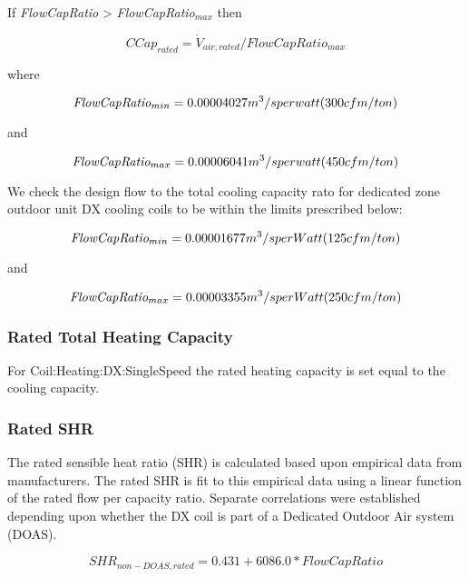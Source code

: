 If \emph{FlowCapRatio} \textgreater{} \emph{FlowCapRatio\(_{max}\)} then

\begin{equation}
CCap_{rated} = \dot V_{air,rated} /FlowCapRatio_{max}
\end{equation}

where

\begin{equation}
\emph{FlowCapRatio\(_{min}\)} = 0.00004027 m^{3}/s per watt (300 cfm/ton)
\end{equation}

and

\begin{equation}
\emph{FlowCapRatio\(_{max}\)} = 0.00006041 m^{3}/s per watt (450 cfm/ton)
\end{equation}

We check the design flow to the total cooling capacity rato for dedicated zone outdoor unit DX cooling coils to be within the limits prescribed below:

\begin{equation}
\emph{FlowCapRatio\(_{min}\)} = 0.00001677 m^{3}/s per Watt (125 cfm/ton)
\end{equation}

and

\begin{equation}
\emph{FlowCapRatio\(_{max}\)} = 0.00003355 m^{3}/s per Watt (250 cfm/ton)
\end{equation}

\subsubsection{Rated Total Heating Capacity}\label{rated-total-heating-capacity-2}

For Coil:Heating:DX:SingleSpeed the rated heating capacity is set equal to the cooling capacity.

\subsubsection{Rated SHR}\label{rated-shr}

The rated sensible heat ratio (SHR) is calculated based upon empirical data from manufacturers. The rated SHR is fit to this empirical data using a linear function of the rated flow per capacity ratio. Separate correlations were established depending upon whether the DX coil is part of a Dedicated Outdoor Air system (DOAS).

\begin{equation}
SHR_{non-DOAS,rated} = 0.431 + 6086.0 * FlowCapRatio
\end{equation}

